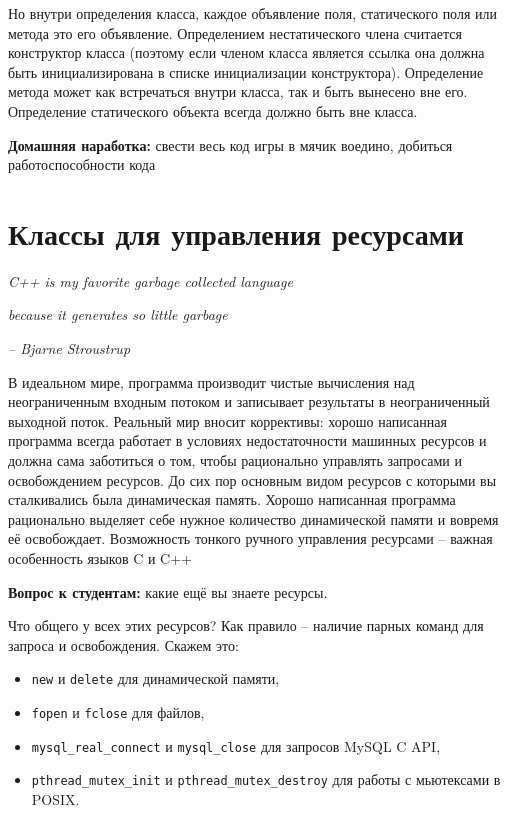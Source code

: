\documentclass[a4paper,12pt,oneside]{book}
\newif\ifanswers
\begin{document}
Но внутри определения класса, каждое объявление поля, статического поля или метода это его объявление. Определением нестатического члена считается конструктор класса (поэтому если членом класса является ссылка она должна быть инициализирована в списке инициализации конструктора). Определение метода может как встречаться внутри класса, так и быть вынесено вне его. Определение статического объекта всегда должно быть вне класса.

\textbf{Домашняя наработка:} свести весь код игры в мячик воедино, добиться работоспособности кода

\pagebreak
\section{Классы для управления ресурсами}\label{WrapClasses}

\hfill\textit{C++ is my favorite garbage collected language}

\hfill\textit{because it generates so little garbage}{\vspace{0.5em}}

\hfill\textit{-- Bjarne Stroustrup}

В идеальном мире, программа производит чистые вычисления над неограниченным входным потоком и записывает результаты в неограниченный выходной поток. Реальный мир вносит коррективы: хорошо написанная программа всегда работает в условиях недостаточности машинных ресурсов и должна сама заботиться о том, чтобы рационально управлять запросами и освобождением ресурсов. До сих пор основным видом ресурсов с которыми вы сталкивались была динамическая память. Хорошо написанная программа рационально выделяет себе нужное количество динамической памяти и вовремя её освобождает. Возможность тонкого ручного управления ресурсами -- важная особенность языков C и C++

\textbf{Вопрос к студентам:} какие ещё вы знаете ресурсы.

\ifanswers
Ожидаемые ответы: файловые дескрипторы, мьютексы, шрифты и кисти, объекты гуя, соединения с бд, сокеты.
\fi

Что общего у всех этих ресурсов? Как правило -- наличие парных команд для запроса и освобождения. 
Скажем это: 
\begin{itemize}
\item
\lstinline!new! и \lstinline!delete! для динамической памяти, 
\item
\lstinline!fopen! и \lstinline!fclose! для файлов, 
\item
\lstinline!mysql_real_connect! и \lstinline!mysql_close! для запросов MySQL C API, 
\item
\lstinline!pthread_mutex_init! и \lstinline!pthread_mutex_destroy! для работы с мьютексами в POSIX. 
\end{itemize}
\end{document}
